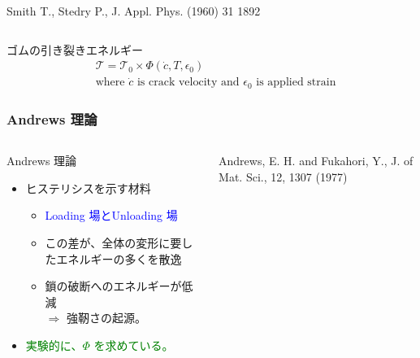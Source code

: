 \documentclass[12pt, dvipdfmx]{beamer}
\begin{document}
\begin{frame}
\begin{columns}[T, totalwidth=\textwidth]
\begin{center}
		{\tiny Smith T., Stedry P., J. Appl. Phys. (1960) 31 1892}
	\end{center}
    \end{columns}
    \begin{alertblock}{ゴムの引き裂きエネルギー}
		\vspace{-5mm}
		\begin{align*}
			&\mathcal{T}=\mathcal{T}_0 \times \Phi(\dot{c}, T, \epsilon_0) \\
			&\text{where $\dot{c}$ is crack velocity and $\epsilon_0$ is applied strain}
		\end{align*}
    \end{alertblock}
\end{frame}

\begin{frame}
	\frametitle{Andrews 理論}
	\begin{columns}[totalwidth=1\textwidth]
		\begin{exampleblock}{Andrews 理論}
			\begin{itemize}
			\item
			\alert{ヒステリシス}を示す材料
				\begin{itemize}
				\item
				\textcolor{blue}{Loading 場とUnloading 場}
				\item
				\alert{この差}が、全体の変形に要したエネルギーの多くを\alert{散逸}
				\item
			鎖の破断へのエネルギーが低減 \\$\Rightarrow$ \alert{強靭さの起源。}
				\end{itemize}	
			\item
			\textcolor{green}{実験的に、$\Phi$ を求めている。}
			\end{itemize}
		\end{exampleblock}
		
		{Andrews, E. H. and Fukahori, Y., J. of Mat. Sci., 12, 1307 (1977)}
		

\end{columns}
\end{frame}
\end{document}
